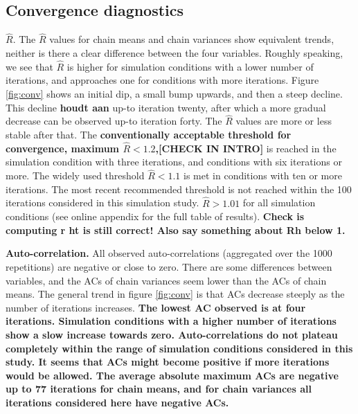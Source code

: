 \documentclass[article]{jss}
\begin{document}
\subsection{Convergence diagnostics}

\textbf{$\widehat{R}$}. The $\widehat{R}$ values for chain means and chain variances show equivalent trends, neither is there a clear difference between the four variables. Roughly speaking, we see that $\widehat{R}$ is higher for simulation conditions with a lower number of iterations, and approaches one for conditions with more iterations. Figure \ref{fig:conv} shows an initial dip, a small bump upwards, and then a steep decline. This decline \textbf{houdt aan} up-to iteration twenty, after which a more gradual decrease can be observed up-to iteration forty. The $\widehat{R}$ values are more or less stable after that. The \textbf{conventionally acceptable threshold for convergence, maximum $\widehat{R} < 1.2$,[CHECK IN INTRO]} is reached in the simulation condition with three iterations, and conditions with six iterations or more. The widely used threshold $\widehat{R} < 1.1$ is met in conditions with ten or more iterations. The most recent recommended threshold is not reached within the 100 iterations considered in this simulation study. $\widehat{R} > 1.01$ for all simulation conditions (see online appendix for the full table of results). \textbf{Check is computing r ht is still correct! Also say something about Rh below 1.}

\textbf{Auto-correlation.} All observed auto-correlations (aggregated over the 1000 repetitions) are negative or close to zero. There are some differences between variables, and the ACs of chain variances seem lower than the ACs of chain means. The general trend in figure \ref{fig:conv} is that ACs decrease steeply as the number of iterations increases.  \textbf{The lowest AC observed is %
at four iterations. Simulation conditions with a higher number of iterations show a slow increase towards zero. Auto-correlations do not plateau completely within the range of simulation conditions considered in this study. It seems that ACs might become positive if more iterations would be allowed. The average absolute maximum ACs are negative up to 77 iterations for chain means, and for chain variances all iterations considered here have negative ACs.}

\end{document}
